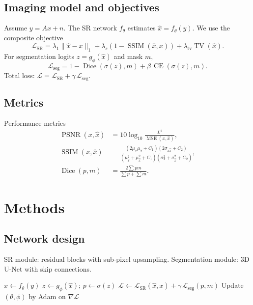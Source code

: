 \documentclass[12pt,a4paper,twoside,openright]{book}
\begin{document}
\section{Imaging model and objectives}
Assume \(y = A x + n\). The SR network \(f_\theta\) estimates
\(\hat x = f_\theta(y)\).
We use the composite objective
\begin{equation}
  \mathcal{L}_{\mathrm{SR}}
  = \lambda_1 \lVert \hat x - x \rVert_1
  + \lambda_s \left(1-\operatorname{SSIM}(\hat x, x)\right)
  + \lambda_{\mathrm{tv}} \operatorname{TV}(\hat x).
  \label{eq:sr_loss}
\end{equation}
For segmentation logits \(z = g_\phi(\hat x)\) and mask \(m\),
\begin{equation}
  \mathcal{L}_{\mathrm{seg}}
  = 1 - \operatorname{Dice}\!\left(\sigma(z), m\right)
    + \beta\, \operatorname{CE}\!\left(\sigma(z), m\right).
  \label{eq:seg_loss}
\end{equation}
Total loss:
\(\mathcal{L} = \mathcal{L}_{\mathrm{SR}} + \gamma\,\mathcal{L}_{\mathrm{seg}}\).

\section{Metrics}
Performance metrics
\begin{align}
\operatorname{PSNR}(x,\hat x) &= 10\log_{10}\!\frac{L^2}{\operatorname{MSE}(x,\hat x)},\\
\operatorname{SSIM}(x,\hat x) &= \frac{(2\mu_x\mu_{\hat x}+C_1)(2\sigma_{x\hat x}+C_2)}
{(\mu_x^2+\mu_{\hat x}^2+C_1)(\sigma_x^2+\sigma_{\hat x}^2+C_2)},\\
\operatorname{Dice}(p,m) &= \frac{2\sum p m}{\sum p + \sum m}.
\end{align}

\chapter{Methods}
\section{Network design}
SR module: residual blocks with sub-pixel upsampling.
Segmentation module: 3D U-Net with skip connections. \cite{lecun2015deep}

\begin{algorithm}
\caption{Joint SR+Seg training}
\label{alg:train}
\begin{algorithmic}[1]
      \State $\hat x \gets f_\theta(y)$
      \State $z \gets g_\phi(\hat x)$; $p\gets\sigma(z)$
      \State $\mathcal{L}\gets \mathcal{L}_{\mathrm{SR}}(\hat x,x)+\gamma\,\mathcal{L}_{\mathrm{seg}}(p,m)$
      \State Update $(\theta,\phi)$ by Adam on $\nabla \mathcal{L}$
    \EndFor
  \EndFor
\EndProcedure
\end{algorithmic}
\end{algorithm}
\end{document}

